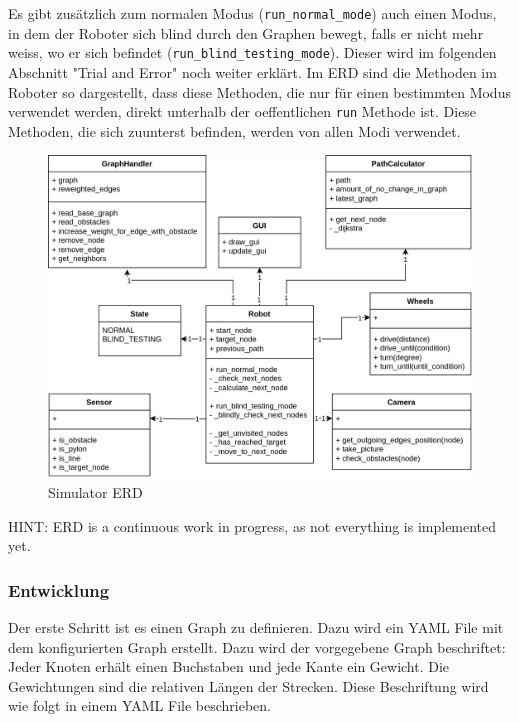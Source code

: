 Es gibt zusätzlich zum normalen Modus (\verb|run_normal_mode|) auch einen Modus, in dem der Roboter sich blind durch den Graphen bewegt, falls er nicht mehr weiss, wo er sich befindet (\verb|run_blind_testing_mode|). Dieser wird im folgenden Abschnitt "Trial and Error" noch weiter erklärt. Im ERD sind die Methoden im Roboter so dargestellt, dass diese Methoden, die nur für einen bestimmten Modus verwendet werden, direkt unterhalb der oeffentlichen \verb|run| Methode ist. Diese Methoden, die sich zuunterst befinden, werden von allen Modi verwendet. 

\begin{figure}[H]
\centering
\includegraphics[width=\textwidth]{assets/informatik-prototyp/simulator/simulator-erd.png}
\caption{Simulator ERD}
\label{fig:simulator-erd}
\end{figure}

HINT: ERD is a continuous work in progress, as not everything is implemented yet.

\subsubsection{Entwicklung}

Der erste Schritt ist es einen Graph zu definieren. Dazu wird ein YAML File mit dem konfigurierten Graph erstellt. 
Dazu wird der vorgegebene Graph beschriftet: Jeder Knoten erhält einen Buchstaben und jede Kante ein Gewicht. Die Gewichtungen sind die relativen Längen der Strecken. Diese Beschriftung wird wie folgt in einem YAML File beschrieben.

